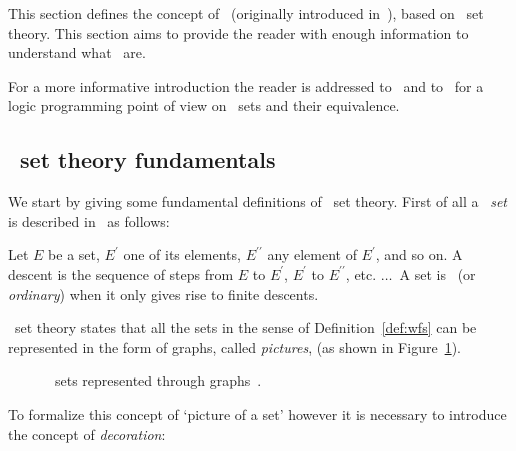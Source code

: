 	This section defines the concept of \emph{\pos}\ (originally introduced
        in~\cite{Gerbrandy1997}), based on \nwf\ set theory.
	This section aims to provide the reader with enough information to understand what \posS\ are.
	
	For a more informative introduction the reader is addressed to~\cite{gerbrandy1999bisimulations,Aczel1989-ACZNS-2,barwise1987liar} and to~\cite{DBLP:conf/iclp/Dovier15} for a logic programming point of view on
	\nwf\ sets and their equivalence.
	\subsection{\Nwf\ set theory fundamentals}\label{subsec-possibilities:set_th}
	We start by giving some fundamental definitions of \nwf\ set theory.
	First of all a \emph{\wf}\ \emph{set} is described in~\cite{Aczel1989-ACZNS-2} as follows:
	\begin{definition}[\wf\ set]\label{def:wfs}
		Let $E$ be a set, $E^\prime$ one of its elements, $E^{\prime\prime}$ any element of $E^\prime$, and so on. A descent is the sequence of steps from $E$ to $E^\prime$, $E^\prime$ to $E^{\prime\prime}$, etc. $\dots$\ A set is 
		\emph{\wf}\ (or \emph{ordinary}) when it only gives rise to finite descents.
	\end{definition}
	\Wf\ set theory states that all the sets in the sense of Definition~\ref{def:wfs} can be represented in the form of graphs, called \emph{pictures}, (as shown in Figure~\ref{fig:von_neu_ord}).
	\begin{figure}
		\centering
		\subfloat[Pictures of von Neumann ordinals where 
		$0=\emptyset$;
		$1=\bra{\emptyset}$;
		$2=\bra{\emptyset, \bra{\emptyset}}$;
		$3=\bra{\emptyset,\bra{\emptyset},\bra{\emptyset,\bra{\emptyset}}}$.]{\scalebox{0.7}{}\label{subfig-1:von_neu_ord}}
		\hfill
		\caption{\Wf\ sets represented through graphs~\cite{Aczel1989-ACZNS-2}.}
		\label{fig:von_neu_ord}
	\end{figure}
	To formalize this concept of \textquoteleft picture of a set' however it is necessary to introduce the concept of \emph{decoration}:
